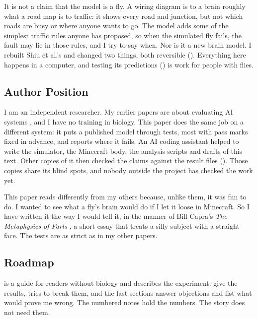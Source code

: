 \documentclass[11pt,a4paper]{article}
\begin{document}
It is not a claim that the model is a fly. A wiring diagram is to a brain roughly what a road map is to traffic: it shows every road and junction, but not which roads are busy or where anyone wants to go. The model adds some of the simplest traffic rules anyone has proposed, so when the simulated fly fails, the fault may lie in those rules, and I try to say when. Nor is it a new brain model. I rebuilt Shiu et al.'s and changed two things, both reversible (). Everything here happens in a computer, and testing its predictions () is work for people with flies.

\subsection{Author Position}

I am an independent researcher. My earlier papers are about evaluating AI systems \citep{lijo2026compound,lijo2026pifbench,lijo2026niche,lijo2026tsb,lijo2026spirits}, and I have no training in biology. This paper does the same job on a different system: it puts a published model through tests, most with pass marks fixed in advance, and reports where it fails. An AI coding assistant helped to write the simulator, the Minecraft body, the analysis scripts and drafts of this text. Other copies of it then checked the claims against the result files (). Those copies share its blind spots, and nobody outside the project has checked the work yet.

This paper reads differently from my others because, unlike them, it was fun to do. I wanted to see what a fly's brain would do if I let it loose in Minecraft. So I have written it the way I would tell it, in the manner of Bill Capra's \emph{The Metaphysics of Farts} \citep{capra2022metaphysics}, a short essay that treats a silly subject with a straight face. The tests are as strict as in my other papers.

\subsection{Roadmap}

 is a guide for readers without biology and  describes the experiment.  give the results,  tries to break them, and the last sections answer objections and list what would prove me wrong. The numbered notes hold the numbers. The story does not need them.
\end{document}
